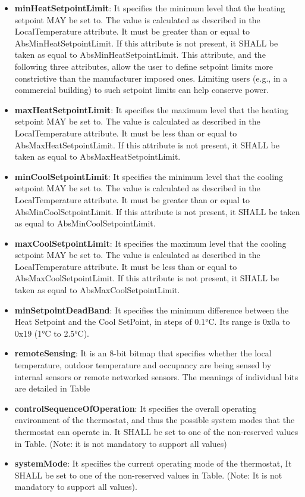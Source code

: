 \begin{itemize}
\item \textbf{minHeatSetpointLimit}: It specifies the minimum level that the heating setpoint MAY be set to. The value is calculated as described in the LocalTemperature attribute. It must be greater than or equal to AbsMinHeatSetpointLimit. If this attribute is not present, it SHALL be taken as equal to AbsMinHeatSetpointLimit. This attribute, and the following three attributes, allow the user to define setpoint limits more constrictive than the manufacturer imposed ones. Limiting users (e.g., in a commercial building) to such setpoint limits can help conserve power.
\item \textbf{maxHeatSetpointLimit}: It specifies the maximum level that the heating setpoint MAY be set to. The value is calculated as described in the LocalTemperature attribute. It must be less than or equal to AbsMaxHeatSetpointLimit. If this attribute is not present, it SHALL be taken as equal to AbsMaxHeatSetpointLimit.
\item \textbf{minCoolSetpointLimit}: It specifies the minimum level that the cooling setpoint MAY be set to. The value is calculated as described in the LocalTemperature attribute. It must be greater than or equal to AbsMinCoolSetpointLimit. If this attribute is not present, it SHALL be taken as equal to AbsMinCoolSetpointLimit.
\item \textbf{maxCoolSetpointLimit}: It specifies the maximum level that the cooling setpoint MAY be set to. The value is calculated as described in the LocalTemperature attribute. It must be less than or equal to AbsMaxCoolSetpointLimit. If this attribute is not present, it SHALL be taken as equal to AbsMaxCoolSetpointLimit.
\item \textbf{minSetpointDeadBand}: It specifies the minimum difference between the Heat Setpoint and the Cool SetPoint, in steps of 0.1°C. Its range is 0x0a to 0x19 (1°C to 2.5°C).
\item \textbf{remoteSensing}: It is an 8-bit bitmap that specifies whether the local temperature, outdoor temperature and occupancy are being sensed by internal sensors or remote networked sensors. The meanings of individual bits are detailed in Table
\item \textbf{controlSequenceOfOperation}:  It specifies the overall operating environment of the thermostat, and thus the possible system modes that the thermostat can operate in. It SHALL be set to one of the non-reserved values in Table. (Note: it is not mandatory to support all values)
\item \textbf{systemMode}: It specifies the current operating mode of the thermostat, It SHALL be set to one of the non-reserved values in Table. (Note: It is not mandatory to support all values).

\end{itemize}
